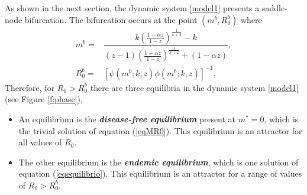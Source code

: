 \documentclass[eng]{MMSB-class-eng}
\begin{document}
{As shown in the next section,  the dynamic system \eqref{model1} presents a saddle-node bifurcation.
The bifurcation occurs at the point $(m^b, R_0^b)$ where
\begin{equation}\label{meq}
\begin{split}
m^b=&\dfrac{k\left( \frac{1-\alpha z}{1-z}\right)^{\frac{1}{k+2}} - k}{(z-1)\left( \frac{1-\alpha z}{1-z}\right)^{\frac{1}{k+2}} + (1-\alpha z)},\\ R_0^b=&\left[ \psi(m^b;k,z)\phi(m^b;k,z)\right]^{-1}.
\end{split}	
\end{equation}
Therefore, for $R_0 > R_0^b$ there are three equilibria in the dynamic system \eqref{model1} (see Figure \ref{f:phase}),

\begin{itemize}
	\item An equilibrium is the \textit{\textbf{disease-free equilibrium}} present at $m^*= 0$, which is the trivial solution of equation (\ref{eqMR0}). 
	This equilibrium is an attractor for all values of $R_0$.
	
	\item The other equilibrium
	is the \textit{\textbf{endemic equilibrium}}, which is one solution of equation (\ref{eqequilibrio}).
	This equilibrium is an attractor for a range of values of $R_0> R_0^b $.
	

\end{itemize}}
\end{document}
